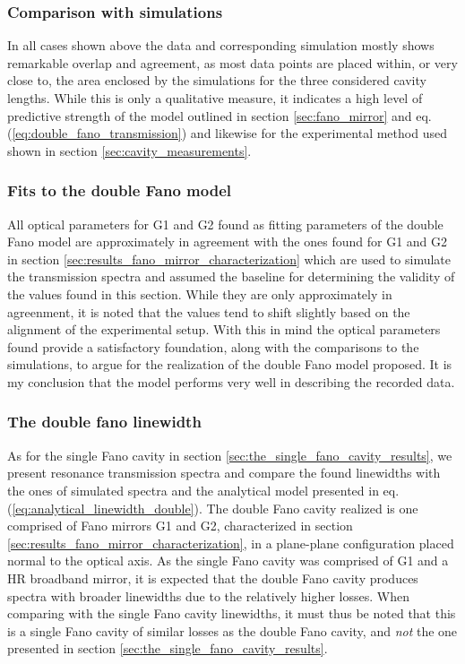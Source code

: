 \subsubsection*{Comparison with simulations}

In all cases shown above the data and corresponding simulation mostly shows remarkable overlap and agreement, as most data points are placed within, or very close to, the area enclosed by the simulations for the three considered cavity lengths. While this is only a qualitative measure, it indicates a high level of predictive strength of the model outlined in section \ref{sec:fano_mirror} and eq. (\ref{eq:double_fano_transmission}) and likewise for the experimental method used shown in section \ref{sec:cavity_measurements}.

\subsubsection*{Fits to the double Fano model}
 
All optical parameters for G1 and G2 found as fitting parameters of the double Fano model are approximately in agreement with the ones found for G1 and G2 in section \ref{sec:results_fano_mirror_characterization} which are used to simulate the transmission spectra and assumed the baseline for determining the validity of the values found in this section. While they are only approximately in agreenment, it is noted that the values tend to shift slightly based on the alignment of the experimental setup. With this in mind the optical parameters found provide a satisfactory foundation, along with the comparisons to the simulations, to argue for the realization of the double Fano model proposed. It is my conclusion that the model performs very well in describing the recorded data. 

\subsubsection{The double fano linewidth}

As for the single Fano cavity in section \ref{sec:the_single_fano_cavity_results}, we present resonance transmission spectra and compare the found linewidths with the ones of simulated spectra and the analytical model presented in eq. (\ref{eq:analytical_linewidth_double}). The double Fano cavity realized is one comprised of Fano mirrors G1 and G2, characterized in section \ref{sec:results_fano_mirror_characterization}, in a plane-plane configuration placed normal to the optical axis. As the single Fano cavity was comprised of G1 and a HR broadband mirror, it is expected that the double Fano cavity produces spectra with broader linewidths due to the relatively higher losses. When comparing with the single Fano cavity linewidths, it must thus be noted that this is a single Fano cavity of similar losses as the double Fano cavity, and \emph{not} the one presented in section \ref{sec:the_single_fano_cavity_results}.

